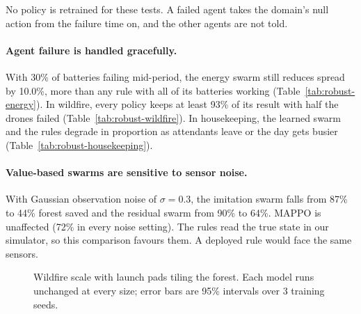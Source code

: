 \documentclass[11pt]{article}
\begin{document}




No policy is retrained for these tests. A failed agent takes the domain's null action from the failure time on, and the other agents are not told.

\paragraph{Agent failure is handled gracefully.} With 30\% of batteries failing mid-period, the energy swarm still reduces spread by 10.0\%, more than any rule with all of its batteries working (Table~\ref{tab:robust-energy}). In wildfire, every policy keeps at least 93\% of its result with half the drones failed (Table~\ref{tab:robust-wildfire}). In housekeeping, the learned swarm and the rules degrade in proportion as attendants leave or the day gets busier (Table~\ref{tab:robust-housekeeping}).

\paragraph{Value-based swarms are sensitive to sensor noise.} With Gaussian observation noise of $\sigma=0.3$, the imitation swarm falls from 87\% to 44\% forest saved and the residual swarm from 90\% to 64\%. MAPPO is unaffected (72\% in every noise setting). The rules read the true state in our simulator, so this comparison favours them. A deployed rule would face the same sensors.

\begin{figure}[t]
\centering
{}
\caption{Wildfire scale with launch pads tiling the forest. Each model runs unchanged at every size; error bars are 95\% intervals over 3 training seeds.}
\label{fig:scale}
\end{figure}
\end{document}
